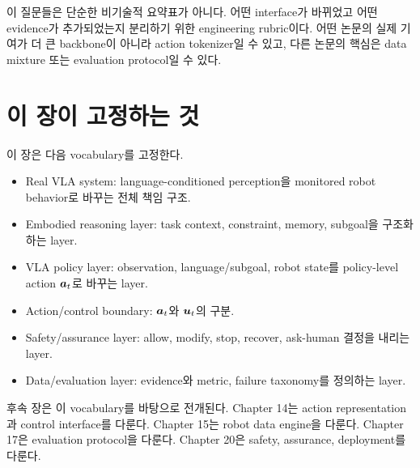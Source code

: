 이 질문들은 단순한 비기술적 요약표가 아니다. 어떤 interface가 바뀌었고 어떤 evidence가 추가되었는지 분리하기 위한 engineering rubric이다. 어떤 논문의 실제 기여가 더 큰 backbone이 아니라 action tokenizer일 수 있고, 다른 논문의 핵심은 data mixture 또는 evaluation protocol일 수 있다.

\section{이 장이 고정하는 것}

이 장은 다음 vocabulary를 고정한다.

\begin{itemize}
  \item Real VLA system: language-conditioned perception을 monitored robot behavior로 바꾸는 전체 책임 구조.
  \item Embodied reasoning layer: task context, constraint, memory, subgoal을 구조화하는 layer.
  \item VLA policy layer: observation, language/subgoal, robot state를 policy-level action $\bm{a}_t$로 바꾸는 layer.
  \item Action/control boundary: $\bm{a}_t$와 $\bm{u}_t$의 구분.
  \item Safety/assurance layer: allow, modify, stop, recover, ask-human 결정을 내리는 layer.
  \item Data/evaluation layer: evidence와 metric, failure taxonomy를 정의하는 layer.
\end{itemize}

후속 장은 이 vocabulary를 바탕으로 전개된다. Chapter 14는 action representation과 control interface를 다룬다. Chapter 15는 robot data engine을 다룬다. Chapter 17은 evaluation protocol을 다룬다. Chapter 20은 safety, assurance, deployment를 다룬다.

